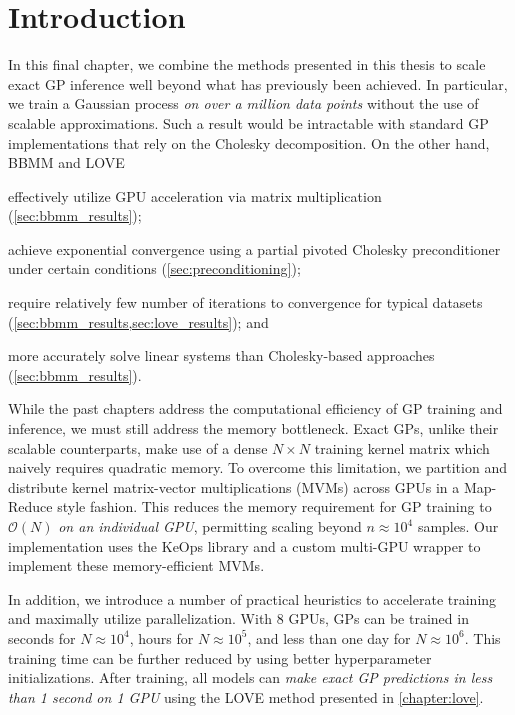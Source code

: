 \section{Introduction}


In this final chapter, we combine the methods presented in this thesis to scale exact GP inference well beyond what has previously been achieved.
In particular, we train a Gaussian process \emph{on over a million data points} without the use of scalable approximations.
Such a result would be intractable with standard GP implementations that rely on the Cholesky decomposition.
On the other hand, BBMM and LOVE
\begin{enumerate*}
  \item effectively utilize GPU acceleration via matrix multiplication (\cref{sec:bbmm_results});
  \item achieve exponential convergence using a partial pivoted Cholesky preconditioner under certain conditions (\cref{sec:preconditioning});
  \item require relatively few number of iterations to convergence for typical datasets (\cref{sec:bbmm_results,sec:love_results}); and
  \item more accurately solve linear systems than Cholesky-based approaches (\cref{sec:bbmm_results}).
\end{enumerate*}

While the past chapters address the computational efficiency of GP training and inference, we must still address the memory bottleneck.
Exact GPs, unlike their scalable counterparts, make use of a dense $N \times N$ training kernel matrix which naively requires quadratic memory.
To overcome this limitation, we partition and distribute kernel matrix-vector multiplications (MVMs) across GPUs in a Map-Reduce style fashion.
This reduces the memory requirement for GP training to $\mathcal{O}(N)$ \emph{on an individual GPU}, permitting scaling beyond $n\approx 10^4$ samples.
Our implementation uses the KeOps library \cite{charlier2020kernel} and a custom multi-GPU wrapper to implement these memory-efficient MVMs.

In addition, we introduce a number of practical heuristics to accelerate training and maximally utilize parallelization.
With $8$ GPUs, GPs can be trained in seconds for $N \approx 10^4$, hours for $N \approx 10^5$, and less than one day for $N \approx 10^6$.
This training time can be further reduced by using better hyperparameter initializations.
After training, all models can \emph{make exact GP predictions in less than 1 second on 1 GPU} using the LOVE method presented in \cref{chapter:love}.



